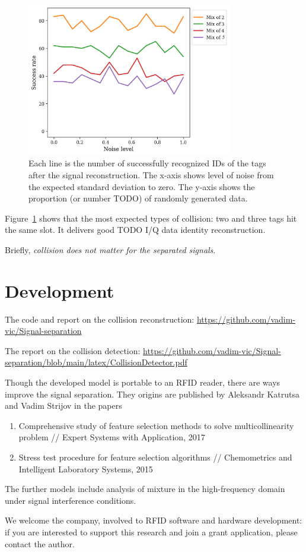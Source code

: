 \documentclass[12pt]{article}
\begin{document}
\begin{figure}[!htbp]
\centering
\includegraphics[width=0.8\textwidth]{fig_mix_one.png}
\caption{Each line is the number of successfully recognized IDs of the tags after the signal reconstruction. The x-axis shows level of noise from the expected standard deviation to zero. The y-axis shows the proportion (or number TODO) of randomly generated data.}
\label{fig:reconstruction}
\end{figure}
Figure~\ref{fig:reconstruction} shows that the most expected types of collision: two and three tags hit the same slot. It delivers good TODO I/Q data identity reconstruction.

Briefly, \emph{collision does not matter for the separated signals}. 

\section{Development}
The code and report on the collision reconstruction: \href{https://github.com/vadim-vic/Signal-separation}{https://github.com/vadim-vic/Signal-separation}

The report on the collision detection: \href{https://github.com/vadim-vic/Signal-separation/blob/main/latex/CollisionDetector.pdf}{https://github.com/vadim-vic/Signal-separation/blob/main/latex/CollisionDetector.pdf}

Though the developed model is portable to an RFID reader, there are ways improve the signal separation. They origins are published by  Aleksandr Katrutsa and Vadim Strijov in the papers~\cite{Katrutsa2017,Katrutsa2015} 
\begin{enumerate}
\item Comprehensive study of feature selection methods to solve multicollinearity problem // Expert Systems with Application, 2017
\item Stress test procedure for feature selection algorithms // Chemometrics and Intelligent Laboratory Systems, 2015
\end{enumerate}

The further models include analysis of  mixture in the high-frequency domain under signal interference conditions.

We welcome the company, involved to RFID software and hardware development: if you are interested to support this research and join a grant application, please contact the author.




\end{document}
